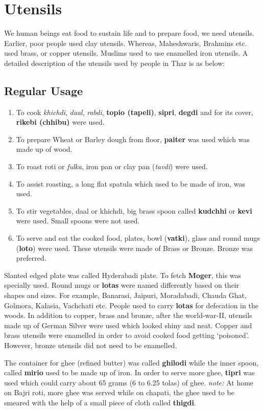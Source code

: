 \section{Utensils}
We human beings eat food to sustain life and to prepare food, we need utensils.
Earlier, poor people used clay utensils. Whereas, Maheshwaris, Brahmins etc.
used brass, or copper utensils. Muslims used to use enamelled iron utensils.
A detailed description of the utensils used by people in Thar is as below:
\subsection{Regular Usage}
\begin{enumerate}
\item To cook \textit{khichdi}, \textit{daal}, \textit{rabdi}, \textbf{topio
(tapeli)}, \textbf{sipri}, \textbf{degdi} and for its cover,
\textbf{rikebi (chhibu)} were used.
\item To prepare Wheat or Barley dough from floor, \textbf{paiter} was used
which was made up of wood.
\item To roast roti or \textit{fulka}, iron pan or clay pan (\textit{tavdi})
were used.
\item To assist roasting, a long flat spatula which used to be made of iron, was
used.
\item To stir vegetables, daal or khichdi, big brass spoon called \textbf{kudchhi} or
\textbf{kevi} were used. Small spoons were not used.
\item To serve and eat the cooked food, plates, bowl (\textbf{vatki}), glass and
round mugs (\textbf{loto}) were used. These utensils were made of Brass or
Bronze. Bronze was preferred.
\end{enumerate}
Slanted edged plate was called Hyderabadi plate. To fetch \textbf{Moger}, this
was specially used. Round mugs or \textbf{lotas} were named differently based on
their shapes and sizes. For example, Banarasi, Jaipuri, Moradabadi, Chauda Ghat,
Golmora, Kalasia, Vachchati etc.
People used to carry \textbf{lotas} for defecation in the woods.
In addition to copper, brass and bronze, after the world-war-II, utensils made
up of German Silver were used which looked shiny and neat. Copper and brass
utensils were enamelled in order to avoid cooked food getting `poisoned'.
However, bronze utensils did not need to be enamelled.

The container for ghee (refined butter) was called \textbf{ghilodi} while the
inner spoon, called \textbf{mirio} used to be made up of iron. In order to serve
more ghee, \textbf{tipri} was used which could carry about 65 grams (6 to 6.25
tolas) of ghee. \emph{note:} At home on Bajri roti, more ghee was served while
on chapati, the ghee used to be smeared with the help of a small piece of cloth
called \textbf{thigdi}.

